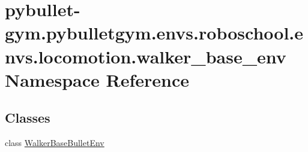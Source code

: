 \hypertarget{namespacepybullet-gym_1_1pybulletgym_1_1envs_1_1roboschool_1_1envs_1_1locomotion_1_1walker__base__env}{}\section{pybullet-\/gym.pybulletgym.\+envs.\+roboschool.\+envs.\+locomotion.\+walker\+\_\+base\+\_\+env Namespace Reference}
\label{namespacepybullet-gym_1_1pybulletgym_1_1envs_1_1roboschool_1_1envs_1_1locomotion_1_1walker__base__env}
\subsection*{Classes}
\begin{DoxyCompactItemize}
\item 
class \hyperlink{classpybullet-gym_1_1pybulletgym_1_1envs_1_1roboschool_1_1envs_1_1locomotion_1_1walker__base__env_1_1_walker_base_bullet_env}{Walker\+Base\+Bullet\+Env}
\end{DoxyCompactItemize}
